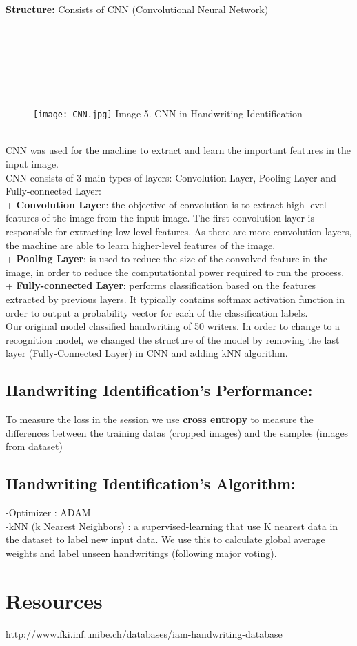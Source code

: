 \documentclass{article}
\begin{document}
\textbf{Structure:} Consists of CNN (Convolutional Neural Network)\\
\\
\\
\\
\\
\\
\\
\begin{figure}[h!]
\texttt{[image: CNN.jpg]}
\centering Image 5. CNN in Handwriting Identification\\
\end{figure}
\\
CNN was used for the machine to extract and learn the important features in the input image.\\ 
CNN consists of 3 main types of layers: Convolution Layer, Pooling Layer and Fully-connected Layer:\\
+ \textbf{Convolution Layer}: the objective of convolution is to extract high-level features of the image from the input image. The first convolution layer is responsible for extracting low-level features. As there are more convolution layers, the machine are able to learn higher-level features of the image. \\
+ \textbf{Pooling Layer}: is used to reduce the size of the convolved feature in the image, in order to reduce the computationtal power required to run the process. \\
+ \textbf{Fully-connected Layer}: performs classification based on the features extracted by previous layers. It typically contains softmax activation function in order to output a probability vector for each of the classification labels. \\

Our original model classified handwriting of 50 writers. In order to change to a recognition model, we changed the structure of the model by removing the last layer (Fully-Connected Layer) in CNN and adding kNN algorithm. \\

\subsection{Handwriting Identification's Performance:}
To measure the loss in the session we use \textbf{cross entropy} to measure the differences between the training datas (cropped images) and the samples (images from dataset)\\

\subsection{Handwriting Identification's Algorithm:}
-Optimizer : ADAM \\
-kNN (k Nearest Neighbors) : a supervised-learning that use K nearest data in the dataset to label new input data. We use this to calculate global average weights and label unseen handwritings (following major voting). 

\section{Resources}
http://www.fki.inf.unibe.ch/databases/iam-handwriting-database
\end{document}
